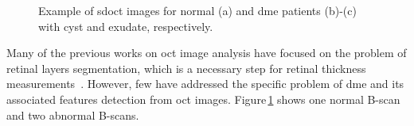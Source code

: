 \begin{figure}
\begin{center}
\hspace*{\fill}
\end{center}
\caption{ Example of \gls{sdoct} images for normal (a) and \gls{dme} patients (b)-(c) with cyst and exudate, respectively.}
\label{fig:dme-normal}
\end{figure}
Many of the previous works on \gls{oct} image analysis have focused on the problem of retinal layers segmentation, which is a necessary step for retinal thickness measurements~\cite{Chiu2010,Kafieh2013}.
However, few have addressed the specific problem of \gls{dme} and its associated features detection from \gls{oct} images.
Figure\,\ref{fig:dme-normal} shows one normal B-scan and two abnormal B-scans.

